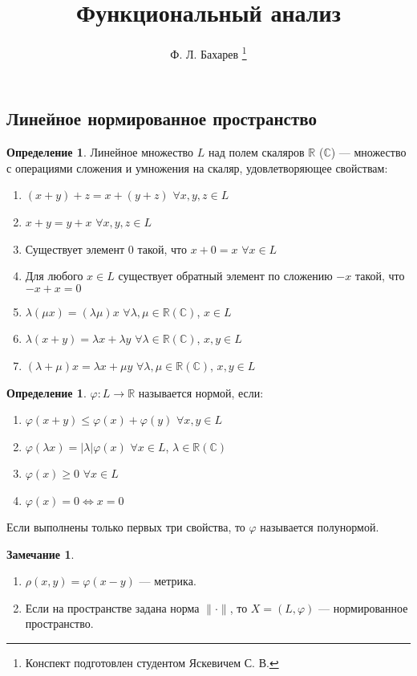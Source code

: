 \documentclass[11pt,openany,a4paper]{scrartcl}
\author{Ф. Л. Бахарев \thanks{Конспект подготовлен студентом Яскевичем С. В.}}
\title{Функциональный анализ}
\theoremstyle{plain}
\theoremstyle{definition}
\newtheorem{definition}[theorem]{Определение}
\newtheorem{remark}[theorem]{Замечание}
\newcommand\mb{\mathbb}
\newcommand\real{\mb R}
\newcommand{\complex}{\mb C}
\begin{document}
\maketitle

\tableofcontents

\pagebreak

\subsection{Линейное нормированное пространство}

\begin{definition}
    Линейное множество $L$ над полем скаляров $\real$ ($\complex$) — множество с
    операциями сложения и умножения на скаляр, удовлетворяющее свойствам:
    \begin{enumerate}
        \item $(x + y) + z = x + (y + z)$ $\forall x,y,z \in L$
        \item $x + y = y + x$ $\forall x,y,z \in L$
        \item Существует элемент $0$ такой, что $x + 0 = x$ $\forall x \in L$
        \item Для любого $x \in L$ существует обратный элемент по сложению $-x$ такой, что
        $-x + x = 0$
        \item $\lambda(\mu x) = (\lambda \mu) x$ $\forall \lambda, \mu
        \in \real(\complex)$, $x \in L$
        \item $\lambda(x + y) = \lambda x + \lambda y$ $\forall \lambda \in 
        \real(\complex)$, $x,y \in L$
        \item $(\lambda + \mu)x = \lambda x + \mu y$ $\forall \lambda,
        \mu \in \real(\complex)$, $x,y \in L$
    \end{enumerate}
\end{definition}

\begin{definition}
    $\varphi: L \to \real$ называется нормой, если:
    \begin{enumerate}
        \item $\varphi(x + y) \leqslant \varphi(x) + \varphi(y)$
        $\forall x, y \in L$
        \item $\varphi(\lambda x) = |\lambda|\varphi(x)$
        $\forall x \in L$, $\lambda \in \real(\complex)$
        \item $\varphi(x) \geqslant 0$ $\forall x \in L$
        \item $\varphi (x) = 0 \iff x = 0$
    \end{enumerate}

    Если выполнены только первых три свойства, то $\varphi$ называется полунормой.
\end{definition}
\begin{remark}
\mbox{}
    \begin{enumerate}
        \item $\rho (x, y) = \varphi(x - y)$ — метрика.
        \item Если на пространстве задана норма $\|\cdot\|$, то $X = (L, \varphi)$ —
        нормированное пространство.
    \end{enumerate}
\end{remark}
\end{document}
